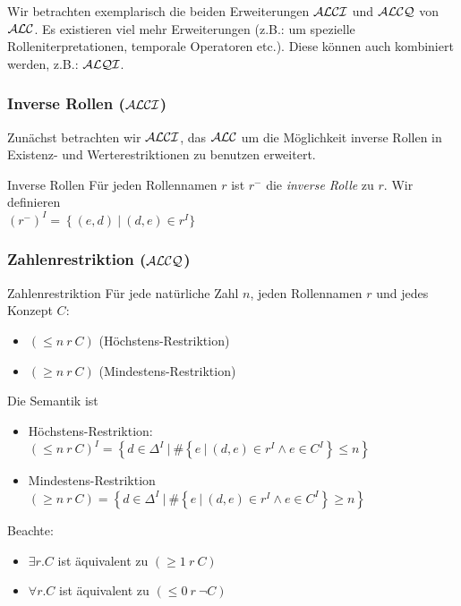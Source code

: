 Wir betrachten exemplarisch die beiden Erweiterungen $\mathcal{A}\mathcal{L}\mathcal{C}\mathcal{I}$ und $\mathcal{A}\mathcal{L}\mathcal{C}\mathcal{Q}$ von $\mathcal{A}\mathcal{L}\mathcal{C}$. Es existieren viel mehr Erweiterungen (z.B.: um spezielle Rolleniterpretationen, temporale Operatoren etc.). Diese können auch kombiniert werden, z.B.: $\mathcal{A}\mathcal{L}\mathcal{Q}\mathcal{I}$.

\subsubsection{Inverse Rollen ($\mathcal{A}\mathcal{L}\mathcal{C}\mathcal{I}$)}\label{inverse-rollen-alci}

Zunächst betrachten wir $\mathcal{A}\mathcal{L}\mathcal{C}\mathcal{I}$, das $\mathcal{A}\mathcal{L}\mathcal{C}$ um die Möglichkeit inverse Rollen in Existenz- und Werterestriktionen zu benutzen erweitert.

\begin{definition}{Inverse Rollen}
Für jeden Rollennamen $r$ ist $r^{-}$ die \emph{inverse
Rolle} zu $r$. Wir definieren \\
$\left( r^{-} \right)^{I} = \left\{ \left( e,d \right)\  \right|\ \left( d,e \right) \in r^{I}\}$
\end{definition}

\subsubsection{Zahlenrestriktion ($\mathcal{A}\mathcal{L}\mathcal{C}\mathcal{Q}$)}\label{zahlenrestriktion-alcq}

\begin{definition}{Zahlenrestriktion}
Für jede natürliche Zahl $n$, jeden Rollennamen $r$ und
jedes Konzept $C$:

\begin{itemize}
  \item $\left( \leq n\ r\ C \right)$ (Höchstens-Restriktion)
  \item $\left( \geq n\ r\ C \right)$ (Mindestens-Restriktion)
\end{itemize}

Die Semantik ist
\begin{itemize}
\item
  Höchstens-Restriktion:
  $\left( \leq n\ r\ C \right)^{I} = \left\{ d \in \Delta^{I}\ |\ \#\left\{ e\ |\ \left( d,e \right) \in r^{I} \land e \in C^{I} \right\} \leq n \right\}$
\item
  Mindestens-Restriktion
  $( \geq n\ r\ C) = \left\{ d \in \Delta^{I}\ |\ \#\left\{ e\ |\ \left( d,e \right) \in r^{I} \land e \in C^{I} \right\} \geq n \right\}$
\end{itemize}
\end{definition}

Beachte:

\begin{itemize}
  \item $\exists r.C$ ist äquivalent zu $(\geq 1\ r\ C)$
  \item $\forall r.C$ ist äquivalent zu $(\leq 0\ r\ \neg C)$
\end{itemize}